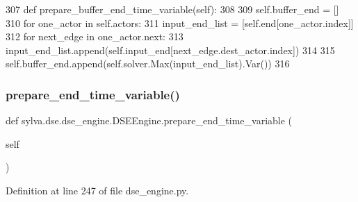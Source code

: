 \begin{DoxyCode}
307     \textcolor{keyword}{def }prepare\_buffer\_end\_time\_variable(self):
308 
309         self.buffer\_end = []
310         \textcolor{keywordflow}{for} one\_actor \textcolor{keywordflow}{in} self.actors:
311             input\_end\_list = [self.end[one\_actor.index]]
312             \textcolor{keywordflow}{for} next\_edge \textcolor{keywordflow}{in} one\_actor.next:
313                 input\_end\_list.append(self.input\_end[next\_edge.dest\_actor.index])
314 
315             self.buffer\_end.append(self.solver.Max(input\_end\_list).Var())
316 
\end{DoxyCode}
\mbox{\label{classsylva_1_1dse_1_1dse__engine_1_1_d_s_e_engine_a1c6ea77716fae6e7b5c979c6ec21c0dc}} 
\subsubsection{\texorpdfstring{prepare\+\_\+end\+\_\+time\+\_\+variable()}{prepare\_end\_time\_variable()}}
{\footnotesize\ttfamily def sylva.\+dse.\+dse\+\_\+engine.\+D\+S\+E\+Engine.\+prepare\+\_\+end\+\_\+time\+\_\+variable (\begin{DoxyParamCaption}\item[{}]{self }\end{DoxyParamCaption})}



Definition at line 247 of file dse\+\_\+engine.\+py.



